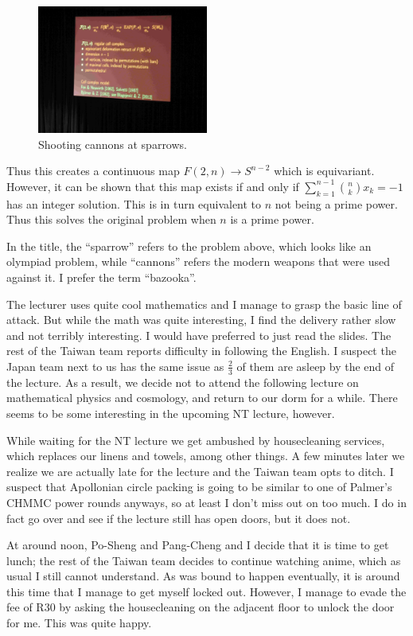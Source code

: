 \documentclass[11pt]{scrreprt}
\numberwithin{figure}{chapter}
\begin{document}
\begin{figure}[ht]
  \centering
  \includegraphics[width=0.5\textwidth]{media/cellcomplex.jpg}
  \caption{Shooting cannons at sparrows.}
\end{figure}


Thus this creates a continuous map $F(2,n) \to S^{n-2}$ which is equivariant.
However, it can be shown that this map exists if and only if
$\sum_{k=1}^{n-1} \binom nk x_k = -1$
has an integer solution. This is in turn equivalent to $n$ not being a prime power.
Thus this solves the original problem when $n$ is a prime power.

In the title, the ``sparrow'' refers to the problem above, which looks like an olympiad problem,
while ``cannons'' refers the modern weapons that were used against it.
I prefer the term ``bazooka''.

The lecturer uses quite cool mathematics and I manage to grasp the basic line of attack.
But while the math was quite interesting, I find the delivery rather slow and not terribly interesting.
I would have preferred to just read the slides.
The rest of the Taiwan team reports difficulty in following the English.
I suspect the Japan team next to us has the same issue as $\tfrac 23$ of them are asleep by the end
of the lecture.
As a result, we decide not to attend the following lecture on mathematical physics and cosmology,
and return to our dorm for a while.
There seems to be some interesting in the upcoming NT lecture, however.

While waiting for the NT lecture we get ambushed by housecleaning services, which replaces our linens and towels,
among other things. A few minutes later we realize we are actually late for the lecture and the Taiwan team opts
to ditch. I suspect that Apollonian circle packing is going to be similar to one of Palmer's CHMMC power rounds anyways, so
at least I don't miss out on too much. I do in fact go over and see if the lecture still has open doors, but it does not.

At around noon, Po-Sheng and Pang-Cheng and I decide that it is time to get lunch; the rest of the Taiwan team decides to continue watching
anime, which as usual I still cannot understand.
As was bound to happen eventually, it is around this time that I manage to get myself locked out.
However, I manage to evade the fee of R30 by asking the housecleaning on the adjacent floor to unlock the door for me.
This was quite happy.
\end{document}
